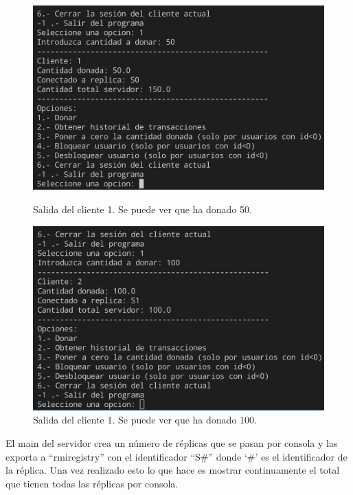 \documentclass{article}
\begin{document}
\begin{figure}[H]
    \centering
    \begin{minipage}[H]{0.49\textwidth}
        \centering
        \includegraphics[width=\textwidth]{imagenes/donObligatorioC1.png}
        \caption{Salida del cliente 1. Se puede ver que ha donado 50.}        
    \end{minipage}
    \hfill
    \begin{minipage}[H]{0.49\textwidth}
        \centering
        \includegraphics[width=\textwidth]{imagenes/donObligatorioC2.png}
        \caption{Salida del cliente 1. Se puede ver que ha donado 100.}        
    \end{minipage}
\end{figure}

El main del servidor crea un número de réplicas que se pasan por consola y las exporta a ``rmiregistry'' con el identificador ``S\#'' donde `\#' es el identificador de la réplica. Una vez realizado esto lo que hace es mostrar continuamente el total que tienen todas las réplicas por consola.
\end{document}
